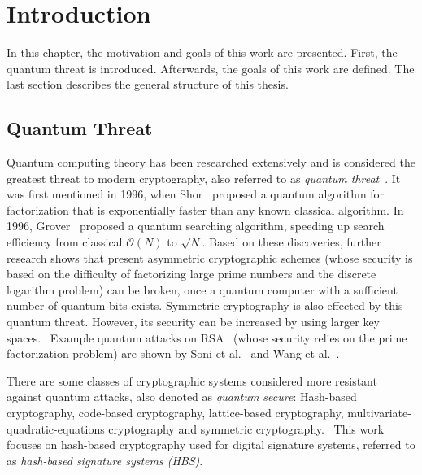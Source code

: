 \chapter{Introduction}
\label{cha:introduction}
In this chapter, the motivation and goals of this work are presented. First, the quantum threat is introduced. Afterwards, the goals of this work are defined. The last section describes the general structure of this thesis.

\section{Quantum Threat} %
Quantum computing theory has been researched extensively and is considered the greatest threat to modern cryptography, also referred to as \textit{quantum threat}~\cite{impact_quantum_crypto_2018}.
It was first mentioned in 1996, when Shor~\cite{shors_algo_original_1999} proposed a quantum algorithm for factorization that is exponentially faster than any known classical algorithm. In 1996, Grover~\cite{grovers_algo_basispaper_1997} proposed a quantum searching algorithm, speeding up search efficiency from classical $\mathcal{O}(N)$ to $\sqrt{N}$. 
Based on these discoveries, further research shows that present asymmetric cryptographic schemes (whose security is based on the difficulty of factorizing large prime numbers and the discrete logarithm problem) can be broken, once a quantum computer with a sufficient number of quantum bits exists. 
Symmetric cryptography is also effected by this quantum threat. However, its security can be increased by using larger key spaces.~\cite{impact_quantum_crypto_2018} %
Example quantum attacks on RSA~\cite{rsa_patent} (whose security relies on the prime factorization problem) are shown by Soni et al.~\cite{RSA_pq-attack_examples_2018} and Wang et al.~\cite{RSA_pq-attack_without_factorization_2018}.

There are some classes of cryptographic systems considered more resistant against quantum attacks, also denoted as \textit{quantum secure}: Hash-based cryptography, code-based cryptography, lattice-based cryptography, multivariate-quadratic-equations cryptography and symmetric cryptography.~\cite{book_pqc_bernstein_2004}
This work focuses on hash-based cryptography used for digital signature systems, referred to as \textit{hash-based signature systems (HBS)}.

